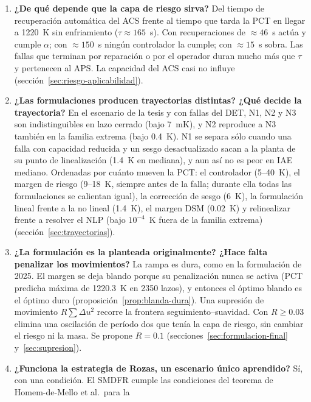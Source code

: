 \begin{enumerate}[label=\textbf{Q\arabic*.}]
        realizaciones (secciones~\ref{sec:riesgo-formulaciones} y~\ref{sec:riesgo-parciales}).
  \item \textbf{¿De qué depende que la capa de riesgo sirva?} Del tiempo de recuperación
        automática del ACS frente al tiempo que tarda la PCT en llegar a 1220~K sin enfriamiento
        ($\tau\approx165$~s). Con recuperaciones de $\approx46$~s actúa y cumple $\alpha$; con
        $\approx150$~s ningún controlador la cumple; con $\approx15$~s sobra. Las fallas que
        terminan por reparación o por el operador duran mucho más que $\tau$ y pertenecen al
        APS. La capacidad del ACS casi no influye (sección~\ref{sec:riesgo-aplicabilidad}).
  \item \textbf{¿Las formulaciones producen trayectorias distintas? ¿Qué decide la
        trayectoria?} En el escenario de la tesis y con fallas del DET, N1, N2 y N3 son
        indistinguibles en lazo cerrado (bajo 7~mK), y N2 reproduce a N3 también en la familia
        extrema (bajo 0.4~K). N1 se separa sólo cuando una falla con capacidad reducida y un sesgo
        desactualizado sacan a la planta de su punto de linealización (1.4~K en mediana), y aun
        así no es peor en IAE mediano. Ordenadas por cuánto mueven la PCT: el controlador
        (5--40~K), el margen de riesgo (9--18~K, siempre antes de la falla; durante ella todas
        las formulaciones se calientan igual), la corrección de sesgo (6~K), la formulación
        lineal frente a la no lineal (1.4~K), el margen DSM (0.02~K) y relinealizar frente a
        resolver el NLP (bajo $10^{-4}$~K fuera de la familia extrema)
        (sección~\ref{sec:trayectorias}).
  \item \textbf{¿La formulación es la planteada originalmente? ¿Hace falta penalizar los
        movimientos?} La rampa es dura, como en la formulación de 2025. El margen se deja
        blando porque su penalización nunca se activa (PCT predicha máxima de 1220.3~K en 2350
        lazos), y entonces el óptimo blando es el óptimo duro
        (proposición~\ref{prop:blanda-dura}). Una supresión de movimiento $R\sum\Delta u^2$
        recorre la frontera seguimiento--suavidad. Con $R\ge0.03$ elimina una oscilación de
        período dos que tenía la capa de riesgo, sin cambiar el riesgo ni la masa. Se propone
        $R=0.1$ (secciones~\ref{sec:formulacion-final} y~\ref{sec:supresion}).
  \item \textbf{¿Funciona la estrategia de Rozas, un escenario único aprendido?} Sí, con una
        condición. El SMDFR cumple las condiciones del teorema de Homem-de-Mello et al.\ para la

\end{enumerate}
